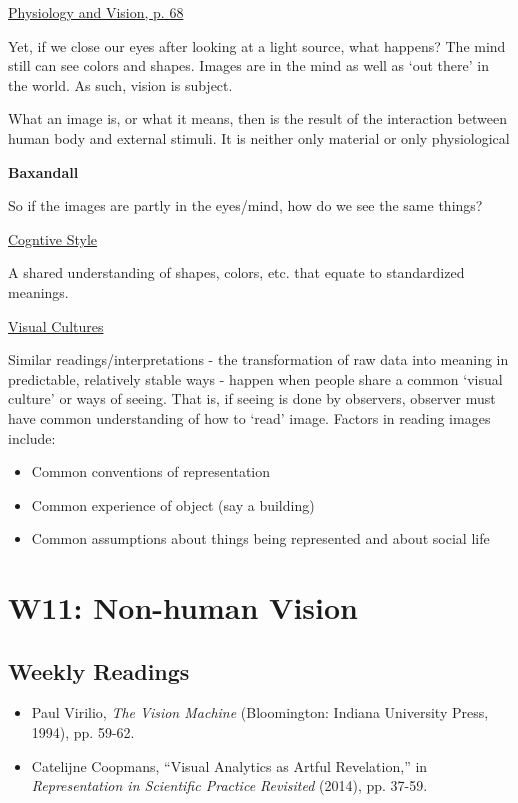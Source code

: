 \documentclass[a4paper]{article}
\begin{document}
\medskip
\noindent\underline{Physiology and Vision, p. 68}

\medskip
\noindent Yet, if we close our eyes after looking at a light source, what happens? The mind still can see colors and shapes. Images are in the mind as well as `out there' in the world. As such, vision is subject.

\medskip
\noindent What an image is, or what it means, then is the result of the interaction between human body and external stimuli. It is neither only material or only physiological

\bigskip
\noindent\textbf{Baxandall}

\medskip
\noindent So if the images are partly in the eyes/mind, how do we see the same things? 

\medskip
\noindent\underline{Cogntive Style}

\medskip
\noindent A shared understanding of shapes, colors, etc. that equate to standardized meanings.

\medskip
\noindent\underline{Visual Cultures}

\medskip
\noindent Similar readings/interpretations - the transformation of raw data into meaning in predictable, relatively stable ways - happen when people share a common `visual culture' or ways of seeing. That is, if seeing is done by observers, observer must have common understanding of how to `read' image. Factors in reading images include:
\begin{itemize}
	\item Common conventions of representation
	\item Common experience of object (say a building)
	\item Common assumptions about things being represented and about social life
\end{itemize}

\newpage
\section{W11: Non-human Vision}
\subsection*{Weekly Readings}
\begin{itemize}
	\item Paul Virilio, \textit{The Vision Machine} (Bloomington: Indiana University Press, 1994), pp.
	59-62.
	\item Catelijne Coopmans, “Visual Analytics as Artful Revelation,” in \textit{Representation in
	Scientific Practice Revisited} (2014), pp. 37-59.
\end{itemize}
\end{document}
